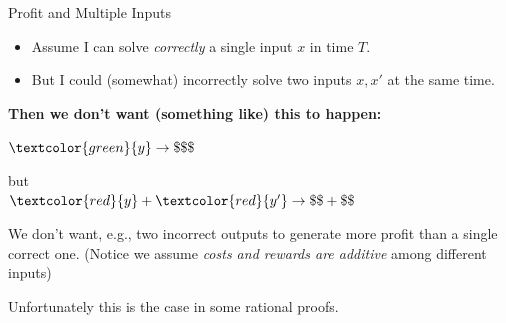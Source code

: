 \begin{frame}{Profit and Multiple Inputs}
	\begin{itemize}[<+- | alert@+>]
		\item Assume I can solve \textit{correctly} a single input $x$ in time $T$.
		\item But I could (somewhat) incorrectly solve two inputs $x,x'$ at the same time.
	\end{itemize}
	\onslide<+->
	
	\textbf{Then we don't want (something like) this to happen:} \onslide<+->
	
	$ \textcolor{green}{y} \rightarrow \$\$\$ $ %
	\onslide<+->
	
	but\\
	$ \textcolor{red}{y} + \textcolor{red}{y'} \rightarrow \$\$ + \$\$ $ %
	\onslide<+->
	\begin{block}{We don't want, e.g., two incorrect outputs to generate more profit than a single correct one.}
		\pause \small{(Notice we assume \textit{costs and rewards are additive} among different inputs)}
	\end{block}
		\onslide<+->
		\medskip
		
		\alert{Unfortunately this is the case in some rational proofs.}
\end{frame}


